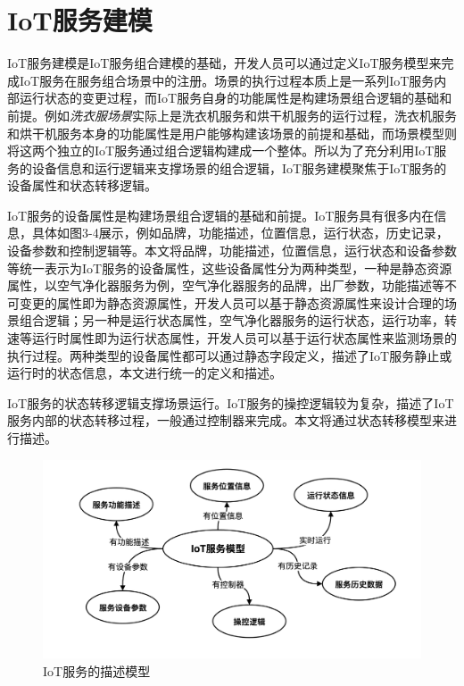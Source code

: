 \documentclass[winfonts,master,twoside]{njuthesis}
\begin{document}
\section{IoT服务建模}
IoT服务建模是IoT服务组合建模的基础，开发人员可以通过定义IoT服务模型来完成IoT服务在服务组合场景中的注册。场景的执行过程本质上是一系列IoT服务内部运行状态的变更过程，而IoT服务自身的功能属性是构建场景组合逻辑的基础和前提。例如\textit{洗衣服场景}实际上是洗衣机服务和烘干机服务的运行过程，洗衣机服务和烘干机服务本身的功能属性是用户能够构建该场景的前提和基础，而场景模型则将这两个独立的IoT服务通过组合逻辑构建成一个整体。所以为了充分利用IoT服务的设备信息和运行逻辑来支撑场景的组合逻辑，IoT服务建模聚焦于IoT服务的设备属性和状态转移逻辑。

IoT服务的设备属性是构建场景组合逻辑的基础和前提。IoT服务具有很多内在信息，具体如图3-4展示，例如品牌，功能描述，位置信息，运行状态，历史记录，设备参数和控制逻辑等。本文将品牌，功能描述，位置信息，运行状态和设备参数等统一表示为IoT服务的设备属性，这些设备属性分为两种类型，一种是静态资源属性，以空气净化器服务为例，空气净化器服务的品牌，出厂参数，功能描述等不可变更的属性即为静态资源属性，开发人员可以基于静态资源属性来设计合理的场景组合逻辑；另一种是运行状态属性，空气净化器服务的运行状态，运行功率，转速等运行时属性即为运行状态属性，开发人员可以基于运行状态属性来监测场景的执行过程。两种类型的设备属性都可以通过静态字段定义，描述了IoT服务静止或运行时的状态信息，本文进行统一的定义和描述。

IoT服务的状态转移逻辑支撑场景运行。IoT服务的操控逻辑较为复杂，描述了IoT服务内部的状态转移过程，一般通过控制器来完成。本文将通过状态转移模型来进行描述。
\begin{figure}
	\centering
	\includegraphics[width=1.0\textwidth]{figure/3-model-driven/device_description_model.png}
	\caption{IoT服务的描述模型}
	\label{ontransact-impl}
\end{figure}
\end{document}
